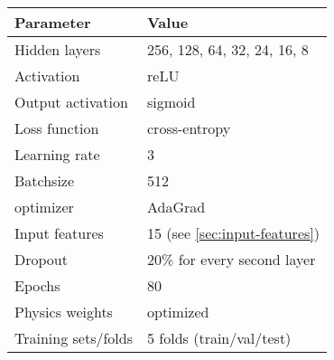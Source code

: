 

\begin{tabular}{l l}
    \toprule
    Parameter & Value \\
    \midrule
    Hidden layers & 256, 128, 64, 32, 24, 16, 8 \\
    Activation & reLU \\ 
    Output activation & sigmoid \\ 
    Loss function & cross-entropy \\ 
    Learning rate & 3 \\
    Batchsize & 512 \\ 
    optimizer & AdaGrad \\
    Input features & 15 (see \cref{sec:input-features}) \\
    Dropout &  20\% for every second layer \\ 
    Epochs & 80 \\
    Physics weights & optimized \\ 
    Training sets/folds & 5 folds (train/val/test) \\
    \bottomrule
\end{tabular}
